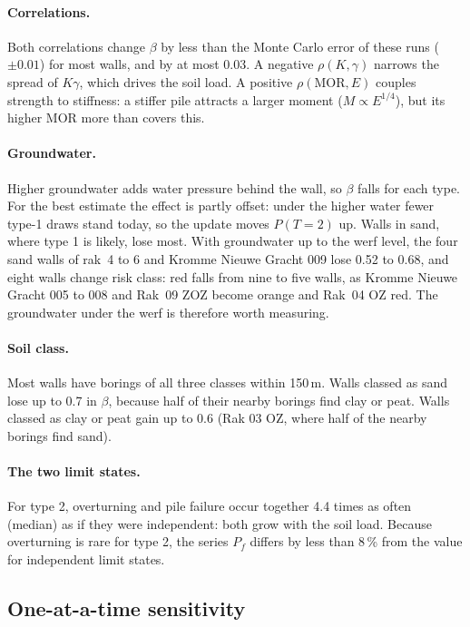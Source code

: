 \paragraph{Correlations.} Both correlations change $\beta$ by less than the
Monte Carlo error of these runs ($\pm 0.01$) for most walls, and by at most
0.03. A negative $\rho(K,\gamma)$ narrows the spread of $K\gamma$, which drives
the soil load. A positive $\rho(\text{MOR},E)$ couples strength to stiffness:
a stiffer pile attracts a larger moment ($M \propto E^{1/4}$), but its higher
MOR more than covers this.

\paragraph{Groundwater.} Higher groundwater adds water pressure behind the
wall, so $\beta$ falls for each type. For the best estimate the effect is
partly offset: under the higher water fewer type-1 draws stand today, so the
update moves $P(T{=}2)$ up. Walls in sand, where type 1 is likely, lose most.
With groundwater up to the werf level, the four sand walls of rak~4 to 6 and
Kromme Nieuwe Gracht 009 lose 0.52 to 0.68, and eight walls change risk class:
red falls from nine to five walls, as Kromme Nieuwe Gracht 005 to 008 and Rak~09
ZOZ become orange and Rak~04 OZ red. The groundwater under the werf is therefore
worth measuring.

\paragraph{Soil class.} Most walls have borings of all three classes within
150\,m. Walls classed as sand lose up to 0.7 in $\beta$, because half of their
nearby borings find clay or peat. Walls classed as clay or peat gain up to
0.6 (Rak 03 OZ, where half of the nearby borings find sand).

\paragraph{The two limit states.} For type 2, overturning and pile failure
occur together 4.4 times as often (median) as if they were independent: both
grow with the soil load. Because overturning is rare for type 2, the series
$P_f$ differs by less than 8\,\% from the value for independent limit states.

\subsection{One-at-a-time sensitivity}\label{app:prob-tornado}

